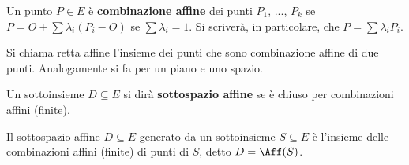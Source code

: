\documentclass[11pt]{article}
\begin{document}
	\begin{definition}
		Un punto $P \in E$ è \textbf{combinazione affine} dei punti
		$P_1$, ..., $P_k$ se $P = O + \sum \lambda_i (P_i - O)$ se
		$\sum \lambda_i = 1$. Si scriverà, in particolare, che
		$P = \sum \lambda_i P_i$.
	\end{definition}

	Si chiama retta affine l'insieme dei punti che sono combinazione affine di
	due punti. Analogamente si fa per un piano e uno spazio.
	
	\begin{definition}
		Un sottoinsieme $D \subseteq E$ si dirà \textbf{sottospazio affine}
		se è chiuso per combinazioni affini (finite).
	\end{definition}

	\begin{definition}
		Il sottospazio affine $D \subseteq E$ generato da un sottoinsieme $S \subseteq E$ è l'insieme delle combinazioni affini (finite) di punti
		di $S$, detto $D = \Aff(S)$. %
	\end{definition}
\end{document}
